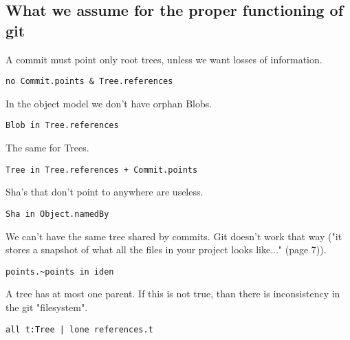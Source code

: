 \subsection{What we assume for the proper functioning of git}

A commit must point only root trees, unless we want
losses of information.
\begin{lstlisting}
no Commit.points & Tree.references    
\end{lstlisting}

In the object model we don't have orphan Blobs. 
\begin{lstlisting}
Blob in Tree.references
\end{lstlisting}

The same for Trees.
\begin{lstlisting}
Tree in Tree.references + Commit.points
\end{lstlisting}

Sha's that don't point to anywhere are useless.
\begin{lstlisting}
Sha in Object.namedBy
\end{lstlisting}

We can't have the same tree shared by commits. Git
doesn't work that way ("it stores a snapshot of what all 
the files in your project looks like..." \cite{gitComm} (page 7)).
\begin{lstlisting}
points.~points in iden 
\end{lstlisting}

A tree has at most one parent. If this is not true, than there 
is inconsistency in the git "filesystem".
\begin{lstlisting}
all t:Tree | lone references.t
\end{lstlisting}

